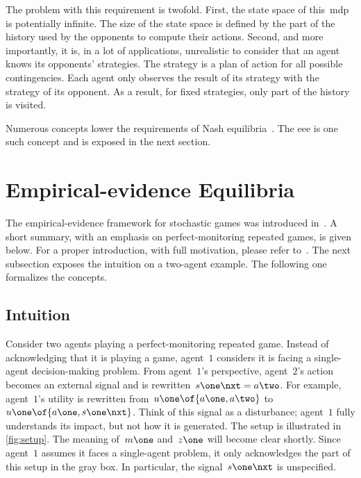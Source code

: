 The problem with this requirement is twofold.
First, the state space of this~\ac{mdp} is potentially infinite.
The size of the state space is defined by the part of the history used by the opponents to compute their actions.
Second, and more importantly, it is, in a lot of applications, unrealistic to consider that an agent knows its opponents' strategies.
The strategy is a plan of action for all possible contingencies.
Each agent only observes the result of its strategy with the strategy of its opponent.
As a result, for fixed strategies, only part of the history is visited.

Numerous concepts lower the requirements of Nash equilibria~\cite{kalai_lehrer:1993:subjective,kandori:2011,jehiel:2005}.
The \ac{eee} is one such concept and is exposed in the next section.

\section{Empirical-evidence Equilibria}
\label{sec:empirical-evidence_equilibria}

The empirical-evidence framework for stochastic games was introduced in~\cite{dudebout_shamma:2012}.
A short summary, with an emphasis on perfect-monitoring repeated games, is given below.
For a proper introduction, with full motivation, please refer to~\cite{dudebout_shamma:2012}.
The next subsection exposes the intuition on a two-agent example.
The following one formalizes the concepts.

\subsection{Intuition}

Consider two agents playing a perfect-monitoring repeated game.
Instead of acknowledging that it is playing a game, agent~\(1\) considers it is facing a single-agent decision-making problem.
From agent~\(1\)'s perspective, agent~\(2\)'s action becomes an external signal and is rewritten~\(s\one\nxt = a\two\).
For example, agent~\(1\)'s utility is rewritten from~\(u\one \of {a\one, a\two}\) to~\(u\one \of {a\one, s\one\nxt}\).
Think of this signal as a disturbance; agent~\(1\) fully understands its impact, but not how it is generated.
The setup is illustrated in \cref{fig:setup}.
The meaning of~\(m\one\) and~\(z\one\) will become clear shortly.
Since agent~\(1\) assumes it faces a single-agent problem, it only acknowledges the part of this setup in the gray box.
In particular, the signal~\(s\one\nxt\) is unspecified.

